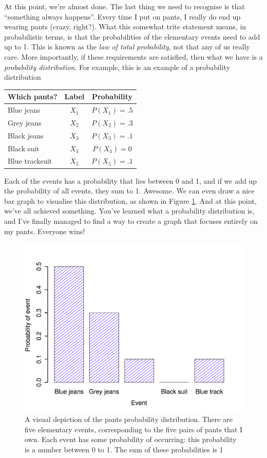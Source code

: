 \documentclass[]{book}
\begin{document}
At this point, we're almost done. The last thing we need to recognise is that ``something always happens''. Every time I put on pants, I really do end up wearing pants (crazy, right?). What this somewhat trite statement means, in probabilistic terms, is that the probabilities of the elementary events need to add up to 1. This is known as the \emph{law of total probability}, not that any of us really care. More importantly, if these requirements are satisfied, then what we have is a \emph{probability distribution}. For example, this is an example of a probability distribution

\begin{longtable}[]{@{}lcc@{}}
\toprule
Which pants? & Label & Probability\tabularnewline
\midrule
\endhead
Blue jeans & \(X_1\) & \(P(X_1) = .5\)\tabularnewline
Grey jeans & \(X_2\) & \(P(X_2) = .3\)\tabularnewline
Black jeans & \(X_3\) & \(P(X_3) = .1\)\tabularnewline
Black suit & \(X_4\) & \(P(X_4) = 0\)\tabularnewline
Blue tracksuit & \(X_5\) & \(P(X_5) = .1\)\tabularnewline
\bottomrule
\end{longtable}

Each of the events has a probability that lies between 0 and 1, and if we add up the probability of all events, they sum to 1. Awesome. We can even draw a nice bar graph to visualise this distribution, as shown in Figure \ref{fig:4pantsprob}. And at this point, we've all achieved something. You've learned what a probability distribution is, and I've finally managed to find a way to create a graph that focuses entirely on my pants. Everyone wins!

\begin{figure}
\centering
\includegraphics{navarro_img/probability/pantsDistribution-eps-converted-to.png}
\caption{\label{fig:4pantsprob}A visual depiction of the pants probability distribution. There are five elementary events, corresponding to the five pairs of pants that I own. Each event has some probability of occurring: this probability is a number between 0 to 1. The sum of these probabilities is 1}
\end{figure}
\end{document}
